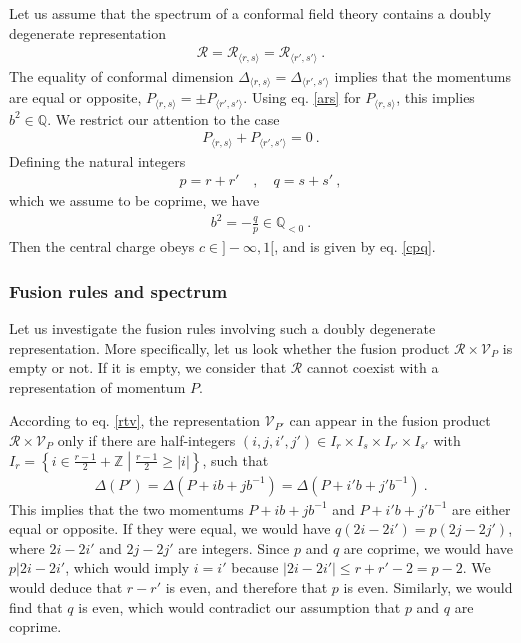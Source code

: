 \documentclass[12pt, a4paper, notitlepage, twoside]{report}
\numberwithin{equation}{section}
\theoremstyle{break}
\begin{document}
Let us assume that the spectrum of a conformal field theory contains a doubly degenerate representation 
\begin{align}
 \mathcal{R}=\mathcal{R}_{\langle r,s \rangle}=\mathcal{R}_{\langle r',s' \rangle}\ .
\end{align}
The equality of conformal dimension $\Delta_{\langle r,s \rangle}=\Delta_{\langle r',s' \rangle}$ implies that 
the momentums are equal or opposite, 
$P_{\langle r,s \rangle}=\pm P_{\langle r',s' \rangle}$. Using eq. \eqref{ars} for $P_{\langle r,s\rangle}$, this implies $b^2\in\mathbb{Q}$. We restrict our attention to the case 
\begin{align}
 P_{\langle r,s \rangle}+P_{\langle r',s' \rangle} = 0\ .
\end{align}
Defining the natural integers 
\begin{align}
 p = r+r' \quad , \quad q = s+s'\ ,
\end{align}
which we assume to be coprime, we have 
\begin{align} 
 \boxed{b^2 = - \frac{q}{p} \in \mathbb{Q}_{<0}} \ .
\end{align}
Then the central charge obeys $c\in ]-\infty, 1[$, and is given by eq. \eqref{cpq}.

\subsubsection{Fusion rules and spectrum}

Let us investigate the fusion rules involving such a doubly degenerate representation. More specifically, let us look whether the fusion product $\mathcal{R}\times \mathcal{V}_P$ is empty or not. If it is empty, we consider that $\mathcal{R}$ cannot coexist with a representation of momentum $P$.

According to eq. \eqref{rtv}, the representation $\mathcal{V}_{P'} $ can appear in the fusion product $\mathcal{R}\times \mathcal{V}_P$ only if there are half-integers $(i,j,i',j')\in I_r\times I_s\times I_{r'}\times I_{s'}$ with $I_r=\left\{i\in \frac{r-1}{2}+\mathbb{Z}\middle| \frac{r-1}{2}\geq |i|\right\}$, such that  
\begin{align}
 \Delta(P') = \Delta\left(P+ ib+jb^{-1}\right) = \Delta\left(P+i'b+j'b^{-1}\right) \ .
 \label{dppdp}
\end{align}
This implies that the two momentums $P+ib+jb^{-1}$ and $ P+i'b+j'b^{-1}$ are either equal or opposite. If they were equal, we would have $q(2i-2i')=p(2j-2j')$, where $2i-2i'$ and $2j-2j'$ are integers. Since $p$ and $q$ are coprime, we would have $p|2i-2i'$, which would imply $i=i'$ because $|2i-2i'|\leq r+r'-2=p-2$. We would deduce that $r-r'$ is even, and therefore that $p$ is even. Similarly, we would find that $q$ is even, which would contradict our assumption that $p$ and $q$ are coprime.
\end{document}
